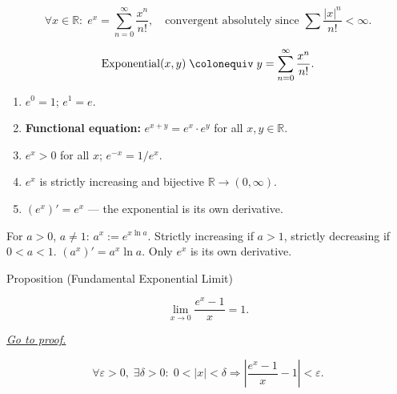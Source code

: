 \begin{remark*}
\[
  \forall x \in \mathbb{R} :\;
  e^x = \sum_{n=0}^\infty \frac{x^n}{n!},
  \quad \text{convergent absolutely since }
  \sum \frac{|x|^n}{n!} < \infty.
\]
\end{remark*}

\begin{remark*}
\[
  \operatorname{Exponential}(x, y)
  \;\colonequiv\;
  y = \sum_{n=0}^\infty \frac{x^n}{n!}.
\]
\end{remark*}

\begin{remark*}
\begin{enumerate}[label=(\roman*)]
  \item $e^0 = 1$;\; $e^1 = e$.
  \item \textbf{Functional equation:} $e^{x+y} = e^x \cdot e^y$
    for all $x, y \in \mathbb{R}$.
  \item $e^x > 0$ for all $x$;\; $e^{-x} = 1/e^x$.
  \item $e^x$ is strictly increasing and bijective
    $\mathbb{R} \to (0,\infty)$.
  \item $(e^x)' = e^x$ --- the exponential is its own derivative.
\end{enumerate}
\end{remark*}

\begin{remark*}
For $a > 0$, $a \neq 1$: $a^x := e^{x\ln a}$. Strictly increasing
if $a > 1$, strictly decreasing if $0 < a < 1$. $(a^x)' = a^x \ln a$.
Only $e^x$ is its own derivative.
\end{remark*}


\begin{propositionbox}{Proposition (Fundamental Exponential Limit)}
\begin{proposition}
\label{prop:limit-exponential-fundamental}
\[
  \lim_{x \to 0} \frac{e^x - 1}{x} = 1.
\]

\smallskip\noindent
\hyperref[prf:limit-exponential-fundamental]{\textit{Go to proof.}}
\end{proposition}
\end{propositionbox}

\begin{remark*}
\[
  \forall\varepsilon > 0,\;
  \exists\delta > 0 :\;
  0 < |x| < \delta \Rightarrow
  \left|\frac{e^x - 1}{x} - 1\right| < \varepsilon.
\]
\end{remark*}

